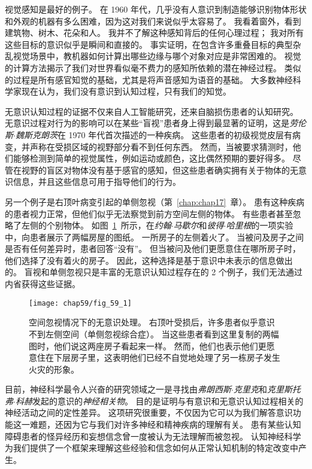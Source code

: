 视觉感知是最好的例子。
在 1960 年代，几乎没有人意识到制造能够识别物体形状和外观的机器有多么困难，因为这对我们来说似乎太容易了。
我看着窗外，看到建筑物、树木、花朵和人。
我并不了解这种感知背后的任何心理过程；
我对所有这些目标的意识似乎是瞬间和直接的。
事实证明，在包含许多重叠目标的典型杂乱视觉场景中，教机器如何计算出哪些边缘与哪个对象对应是非常困难的。
视觉的计算方法揭示了我们对世界看似毫不费力的感知所依赖的潜在神经过程。
类似的过程是所有感官知觉的基础，尤其是将声音感知为语音的基础。
大多数神经科学家现在认为，我们没有意识到认知过程，只有我们的知觉。


无意识认知过程的证据不仅来自人工智能研究，还来自脑损伤患者的认知研究。
无意识过程对行为的影响可以在某些“盲视”患者身上得到最显著的证明，这是\textit{劳伦斯$\cdot$魏斯克朗茨}在 1970 年代首次描述的一种疾病。
这些患者的初级视觉皮层有病变，并声称在受损区域的视野部分看不到任何东西。
然而，当被要求猜测时，他们能够检测到简单的视觉属性，例如运动或颜色，这比偶然预期的要好得多。
尽管在视野的盲区对物体没有基于感官的感知，但这些患者确实拥有关于物体的无意识信息，并且这些信息可用于指导他们的行为。


另一个例子是右顶叶病变引起的单侧忽视（第~\ref{chap:chap17}~章）。
患有这种疾病的患者视力正常，但他们似乎无法察觉到前方空间左侧的物体。
有些患者甚至忽略了左侧的个别物体。
如图~\ref{fig:59_1}~所示，在\textit{约翰$\cdot$马歇尔}和\textit{彼得$\cdot$哈里根}的一项实验中，向患者展示了两幅房屋的图纸。
一所房子的左侧着火了。
当被问及房子之间是否有任何差异时，患者回答“没有”。
但当被问及他们更愿意住在哪所房子时，他们选择了没有着火的房子。
因此，这种选择是基于意识中未表示的信息做出的。
盲视和单侧忽视只是丰富的无意识认知过程存在的 2 个例子，我们无法通过内省获得这些证据。


\begin{figure}[htbp]
	\centering
	\texttt{[image: chap59/fig\_59\_1]}
	\caption{空间忽视情况下的无意识处理。
		右顶叶受损后，许多患者似乎意识不到左侧空间（单侧忽视综合症）。
		当这些患者看到这里复制的两幅图时，他们说这两座房子看起来一样。
		然而，他们也表示他们更愿意住在下层房子里，这表明他们已经不自觉地处理了另一栋房子发生火灾的形象\cite{marshall1988blindsight}。}
	\label{fig:59_1}
\end{figure}


目前，神经科学最令人兴奋的研究领域之一是寻找由\textit{弗朗西斯$\cdot$克里克}和\textit{克里斯托弗$\cdot$科赫}发起的意识的\textit{神经相关物}。
目的是证明与有意识和无意识认知过程相关的神经活动之间的定性差异。
这项研究很重要，不仅因为它可以为我们解答意识功能这一难题，还因为它与我们对许多神经和精神疾病的理解有关。
患有某些认知障碍患者的怪异经历和妄想信念曾一度被认为无法理解而被忽视。
认知神经科学为我们提供了一个框架来理解这些经验和信念如何从正常认知机制的特定改变中产生。



